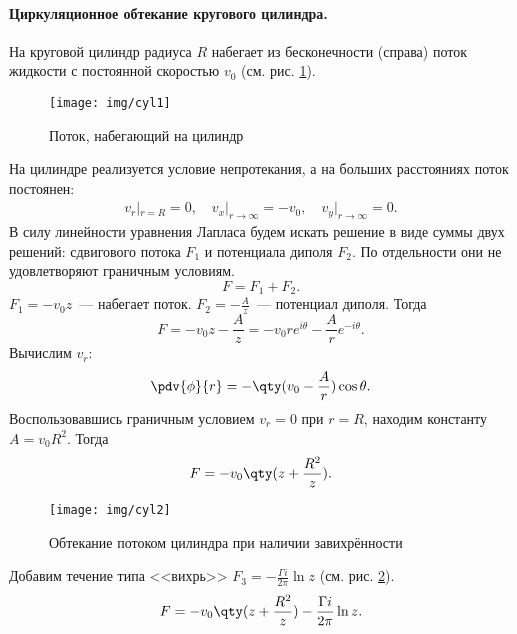 \paragraph{Циркуляционное обтекание кругового цилиндра.}
На круговой цилиндр радиуса $R$ набегает из бесконечности
(справа) поток жидкости с постоянной скоростью $v_0$ (см. рис. \ref{fig:potoccyl}).
\begin{figure}[H]
    \centering
    \texttt{[image: img/cyl1]}
    \caption{Поток, набегающий на цилиндр}
    \label{fig:potoccyl}
\end{figure}
На цилиндре реализуется условие непротекания, а на больших
расстояниях поток постоянен:
\begin{gather}
	v_r|_{r=R}=0, \quad
	v_x|_{r\to\infty}=-v_0, \quad
	v_y|_{r\to\infty}=0.
\end{gather}
В силу линейности уравнения Лапласа будем искать решение в виде
суммы двух решений: сдвигового потока $F_1$ и потенциала диполя $F_2$. По
отдельности они не удовлетворяют граничным условиям.
\begin{equation}
	F=F_1+F_2.
\end{equation}
$F_1=-v_0z$~--- набегает поток.
$\displaystyle F_2=-\frac{A}{z}$~--- потенциал диполя.
Тогда
\begin{equation}
    \label{eq:W60zT8}
    F=-{v_0}{z}-\frac{A}{z}=-v_0r e^{i\theta} -\frac{A}{r} e^{-i\theta}.
\end{equation}
Вычислим $v_r$:
\begin{equation}
	\pdv{\phi}{r}=-\qty(v_0-\frac{A}{r})\cos\theta.
\end{equation}
Воспользовавшись граничным условием $v_r=0$ при $r=R$, находим константу $A=v_0R^2$. Тогда
\begin{equation}
	F=-v_0\qty(z+\frac{R^2}{z}).
\end{equation}
\begin{figure}[ht!]
    \centering
	\texttt{[image: img/cyl2]}
    \caption{Обтекание потоком цилиндра при наличии завихрённости}
    \label{fig:figcyl}
\end{figure}
\begin{comment}
	   <--\
           \
   ______   \
  /	     /\  \
 /	   R/  \  \
/	   /    \  \_____
*     *     |  <----------поток набегает на
\           /
 \         /
  \_______/
\end{comment}
Добавим течение типа <<вихрь>> $F_3=-\frac{\Gamma i}{2\pi}\ln{z}$ (см. рис. \ref{fig:figcyl}).
\begin{equation}
	F=-v_0\qty(z+\frac{R^2}{z})-\frac{\Gamma i}{2\pi}\ln{z}.
\end{equation}
